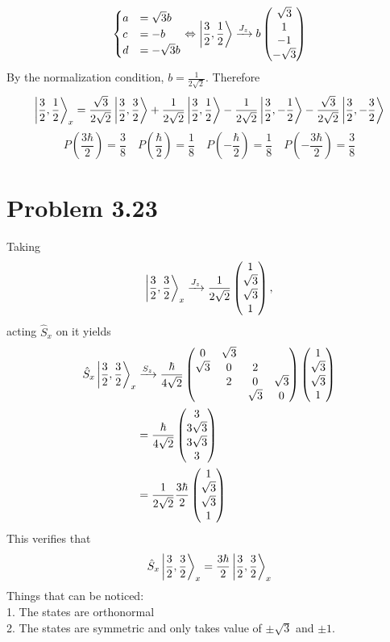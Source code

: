 \documentclass{article}
\begin{document}
\[
    \begin{cases}
        a&=\sqrt{3}b \\
        c&=-b\\
        d&=-\sqrt{3}b
    \end{cases}
    \Leftrightarrow
    \ket{\frac{3}{2},\frac{1}{2}} \xrightarrow{J_z}
    b\pmqty{\sqrt{3} \\ 1 \\ -1 \\ -\sqrt{3} }
\]
By the normalization condition, $b=\frac{1}{2\sqrt{2}}$. Therefore
\[
    \ket{\frac{3}{2}, \frac{1}{2}}_x = 
    \frac{\sqrt{3}}{2\sqrt{2}} \ket{\frac{3}{2}, \frac{3}{2}} +
    \frac{1}{2\sqrt{2}} \ket{\frac{3}{2}, \frac{1}{2}} -
    \frac{1}{2\sqrt{2}} \ket{\frac{3}{2}, -\frac{1}{2}} -
    \frac{\sqrt{3}}{2\sqrt{2}} \ket{\frac{3}{2}, -\frac{3}{2}} 
\]
\[
    \boxed{
        P(\frac{3\hbar}{2}) = \frac{3}{8} \quad
        P(\frac{\hbar}{2}) = \frac{1}{8} \quad
        P(-\frac{\hbar}{2}) = \frac{1}{8} \quad
        P(-\frac{3\hbar}{2}) = \frac{3}{8} 
    }
\]
\section*{Problem 3.23}
Taking
\[
    \ket{\frac{3}{2}, \frac{3}{2}}_x \xrightarrow{J_z}
    \frac{1}{2\sqrt{2}} \pmqty{1\\ \sqrt{3} \\ \sqrt{3}\\1},
\]
acting $\hat{S}_x$ on it yields
\[
    \begin{split}
        \hat{S}_x \ket{\frac{3}{2}, \frac{3}{2}}_x &\xrightarrow{S_z}
        \frac{\hbar}{4\sqrt{2}} \pmqty{0&\sqrt{3}& & \\ \sqrt{3} & 0 & 2 & \\ & 2&0&\sqrt{3}\\ & & \sqrt{3} & 0}\pmqty{1\\ \sqrt{3} \\ \sqrt{3} \\1} \\
        &= \frac{\hbar}{4\sqrt{2}} \pmqty{3 \\ 3\sqrt{3} \\ 3\sqrt{3}\\3} \\
        &= \frac{1}{2\sqrt{2}} \frac{3\hbar}{2} \pmqty{1 \\ \sqrt{3} \\ \sqrt{3} \\ 1}
    \end{split}
\]
This verifies that 
\[
    \hat{S}_x \ket{\frac{3}{2}, \frac{3}{2}}_x  = \frac{3\hbar}{2} \ket{\frac{3}{2}, \frac{3}{2}}_x
\]
Things that can be noticed:\\
1. The states are orthonormal \\
2. The states are symmetric and only takes value of $\pm \sqrt{3}$ and $\pm 1$.
\end{document}
